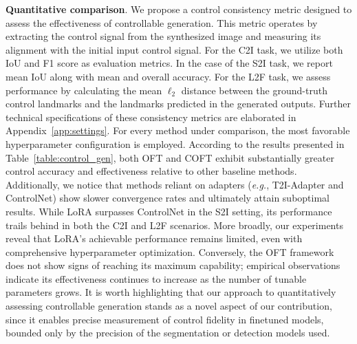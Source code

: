 \textbf{Quantitative comparison}. We propose a control consistency metric designed to assess the effectiveness of controllable generation. This metric operates by extracting the control signal from the synthesized image and measuring its alignment with the initial input control signal. For the C2I task, we utilize both IoU and F1 score as evaluation metrics. In the case of the S2I task, we report mean IoU along with mean and overall accuracy. For the L2F task, we assess performance by calculating the mean $\ell_2$ distance between the ground-truth control landmarks and the landmarks predicted in the generated outputs. Further technical specifications of these consistency metrics are elaborated in Appendix~\ref{app:settings}. For every method under comparison, the most favorable hyperparameter configuration is employed. According to the results presented in Table~\ref{table:control_gen}, both OFT and COFT exhibit substantially greater control accuracy and effectiveness relative to other baseline methods. Additionally, we notice that methods reliant on adapters (\emph{e.g.}, T2I-Adapter and ControlNet) show slower convergence rates and ultimately attain suboptimal results. While LoRA surpasses ControlNet in the S2I setting, its performance trails behind in both the C2I and L2F scenarios. More broadly, our experiments reveal that LoRA’s achievable performance remains limited, even with comprehensive hyperparameter optimization. Conversely, the OFT framework does not show signs of reaching its maximum capability; empirical observations indicate its effectiveness continues to increase as the number of tunable parameters grows. It is worth highlighting that our approach to quantitatively assessing controllable generation stands as a novel aspect of our contribution, since it enables precise measurement of control fidelity in finetuned models, bounded only by the precision of the segmentation or detection models used.

